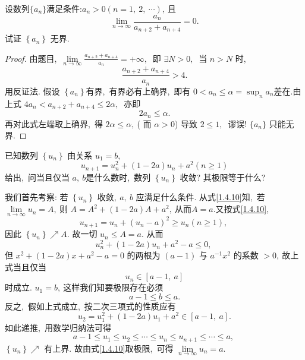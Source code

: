 \newpage
\begin{problem}
	设数列$\{a_n\}$满足条件:$a_n>0(n=1,\ 2,\ \cdots),\ $且
	$$\lim\limits_{n \rightarrow \infty} \frac{a_{n}}{a_{n+2}+a_{n+4}}=0 .$$
	试证  $\left\{a_{n}\right\}$  无界.
\end{problem}
\begin{proof}
	由题目,\  $ \lim\limits_{n \rightarrow \infty} \frac{a_{n+2}+a_{n+4}}{a_{n}}=+\infty ,\ $ 即 $ \exists N>0 ,\ $ 当 $ n>N $ 时,\ 
	$$\frac{a_{n+2}+a_{n+4}}{a_{n}}>4 .$$
	用反证法. 假设 $ \left\{a_{n}\right\}  $有界,\  有界必有上确界,\  即有 $ 0<a_{n} \leqslant \alpha=\sup _{n} a_{n}  $差在.由上式 $4 a_{n}<   a_{n+2}+a_{n+4} \leqslant 2 \alpha ,\ $ 亦即
	$$2 a_{n} \leqslant \alpha .$$
	再对此式左端取上确界,\  得 $ 2 \alpha \leqslant \alpha ,\  $( 而  $\alpha>0  $) 导致  $2 \leqslant 1 ,\ $ 谬误! $\{a_{n}\}$  只能无界.
\end{proof}
\newpage
\begin{problem}
	已知数列 $ \left\{u_{n}\right\} $ 由关系 $ u_{1}=b ,\ $
	\begin{equation}
		u_{n+1}=u_{n}^{2}+(1-2 a) u_{n}+a^{2}(n \geqslant 1)\label{1.4.10}
	\end{equation}
	给出,\ 问当且仅当  $a,\  b  $是什么数时,\ 数列 $ \left\{u_{n}\right\} $ 收敛? 其极限等于什么?
\end{problem}
\begin{solution}
	我们首先考察: 若 $ \left\{u_{n}\right\} $ 收敛$,\   a,\  b $ 应满足什么条件. 从式\eqref{1.4.10}知,\  若 $ \lim\limits_{n \rightarrow \infty} u_{n}=A ,\  $则 $ A=A^{2}+(1-2 a) A+a^{2} ,\  $从而$  A=a . $又按式\eqref{1.4.10},\ 
	$$u_{n+1}=u_{n}+\left(u_{n}-a\right)^{2} \geqslant u_{n}(n \geqslant 1),\ $$
	因此 $ \left\{u_{n}\right\} \nearrow A .$ 故一切 $ u_{n} \leqslant A=a .$ 从而
	$$u_{n}^{2}+(1-2 a) u_{n}+a^{2}-a \leqslant 0,\ $$
	但 $ x^{2}+(1-2 a) x+a^{2}-a=0$  的两根为 $ (a-1) $ 与 $ a^{-1} x^{2} $ 的系数 $ >0 ,\  $故上式当且仅当
	$$u_{n} \in[a-1,\  a]$$
	时成立. $ u_{1}=b ,\  $这样我们知要极限存在必须
	$$a-1 \leqslant b \leqslant a .$$
	反之,\ 假如上式成立,\  按二次三项式的性质应有
	$$u_{2}=u_{1}^{2}+(1-2 a) u_{1}+a^{2} \in[a-1,\  a].$$
	如此递推,\  用数学归纳法可得
	$$a-1 \leqslant u_{1} \leqslant u_{2} \leqslant \cdots \leqslant u_{n} \leqslant u_{n+1} \leqslant \cdots \leqslant a,\ $$
	$\left\{u_{n}\right\} \nearrow$  有上界. 故由式\eqref{1.4.10}取极限,\  可得  $\lim\limits_{n \rightarrow \infty} u_{n}=a .$
\end{solution}
\newpage
